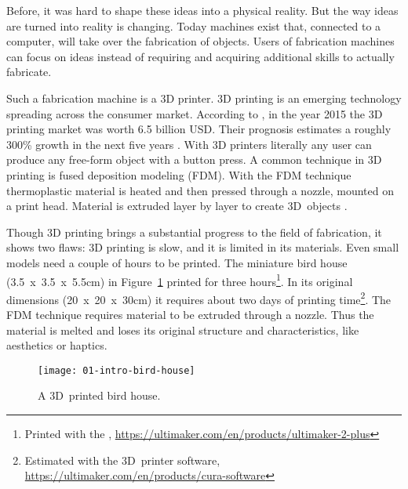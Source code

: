 \documentclass[../ClassicThesis.tex]{subfiles}
\begin{document}
Before, it was hard to shape these ideas into a physical reality. But
the way ideas are turned into reality is changing. Today machines
exist that, connected to a computer, will take over the fabrication of
objects. Users of fabrication machines can focus on ideas
instead of requiring and acquiring additional skills to actually
fabricate.


Such a fabrication machine is a 3D printer. 3D printing is an emerging
technology spreading across the consumer market. According to
, in the year 2015 the 3D printing market was
worth 6.5 billion USD. Their prognosis estimates a roughly 300\%
growth in the next five years \cite{wohlers-market}. With 3D printers
literally any user can produce any free-form object with a button
press. A common technique in 3D printing is fused deposition modeling
(FDM). With the FDM technique
thermoplastic material is heated and then pressed through a nozzle,
mounted on a print head. Material is extruded layer by layer  to
create 3D~objects \cite{fdm}.

Though 3D printing brings a substantial progress to the
field of fabrication, it shows two flaws: 3D printing is
slow, and it is limited in its materials. Even small models
need a couple of hours to be printed. The miniature bird
house (3.5~x~3.5~x~5.5cm) in Figure~\ref{fig:intro-bird-house}
printed for three hours\footnote{Printed with the
  ,
  \url{https://ultimaker.com/en/products/ultimaker-2-plus}}.
In its original dimensions (20~x~20~x~30cm) it requires about
two days of printing time\footnote{Estimated with the
   3D~printer software,
  \url{https://ultimaker.com/en/products/cura-software}}.
The FDM technique requires material to be extruded through a
nozzle. Thus the material is melted and loses its original
structure and characteristics, like aesthetics or haptics.

\begin{figure}[ht]
  \centering
  \texttt{[image: 01-intro-bird-house]}
  \caption{A 3D~printed bird house.}
  \label{fig:intro-bird-house}
\end{figure}


\end{document}
